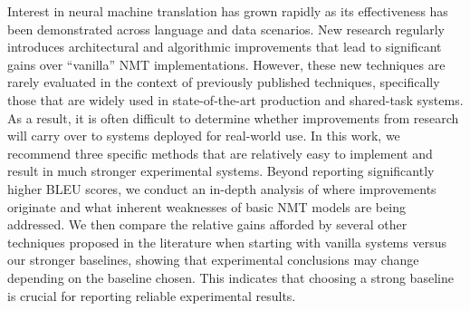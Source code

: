 Interest in neural machine translation has grown rapidly as its effectiveness has been demonstrated across language and data scenarios.  New research regularly introduces architectural and algorithmic improvements that lead to significant gains over ``vanilla'' NMT implementations.  However, these new techniques are rarely evaluated in the context of previously published techniques, specifically those that are widely used in state-of-the-art production and shared-task systems.  As a result, it is often difficult to determine whether improvements from research will carry over to systems deployed for real-world use.  In this work, we recommend three specific methods that are relatively easy to implement and result in much stronger experimental systems.  Beyond reporting significantly higher BLEU scores, we conduct an in-depth analysis of where improvements originate and what inherent weaknesses of basic NMT models are being addressed.  We then compare the relative gains afforded by several other techniques proposed in the literature when starting with vanilla systems versus our stronger baselines, showing that experimental conclusions may change depending on the baseline chosen.  This indicates that choosing a strong baseline is crucial for reporting reliable experimental results.
